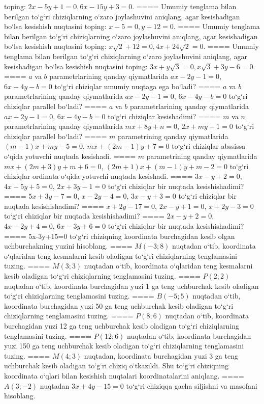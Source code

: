 toping: $2x-5y+1=0, 6x-15y+3=0$.
====
Umumiy tenglama bilan berilgan to‘g‘ri chiziqlarning
o‘zaro joylashuvini aniqlang, agar kesishadigan bo‘lsa kesishish nuqtasini
toping: $x-5=0, y+12=0$.
====
Umumiy tenglama bilan berilgan to‘g‘ri chiziqlarning
o‘zaro joylashuvini aniqlang, agar kesishadigan bo‘lsa kesishish nuqtasini
toping: $x\sqrt{2}+12=0, 4x+24\sqrt{2}=0$.
====
Umumiy tenglama bilan berilgan to‘g‘ri chiziqlarning
o‘zaro joylashuvini aniqlang, agar kesishadigan bo‘lsa kesishish nuqtasini
toping: $3x+y\sqrt{3}=0, x\sqrt{3}+3y-6=0$.
====
$a$ va $b$ parametrlarining qanday qiymatlarida
$ax-2y-1=0$, $6x-4y-b=0$ to‘g‘ri chiziqlar umumiy nuqtaga ega bo‘ladi?
====
$a$ va $b$ parametrlarining qanday qiymatlarida
$ax-2y-1=0$, $6x-4y-b=0$ to‘g‘ri chiziqlar parallel bo‘ladi?
====
$a$ va $b$ parametrlarining qanday qiymatlarida
$ax-2y-1=0$, $6x-4y-b=0$ to‘g‘ri chiziqlar kesishadimi?
====
$m$ va $n$ parametrlarining qanday qiymatlarida
$mx+8y+n=0$, $2x+my-1=0$ to‘g‘ri chiziqlar parallel bo‘ladi?
====
$m$ parametrining qanday qiymatlarida
$ (m-1) x+my-5=0$, $mx+ (2m-1) y+7=0$ to‘g‘ri chiziqlar abssissa
o‘qida yotuvchi nuqtada kesishadi.
====
$m$ parametrining qanday qiymatlarida
$mx+ (2m+3) y+m+6=0$, $ (2m+1) x+ (m-1) y+m-2=0$ to‘g‘ri chiziqlar ordinata
o‘qida yotuvchi nuqtada kesishadi.
====
$3x-y+2=0$, $4x-5y+5=0$, $2x+3y-1=0$
to‘g‘ri chiziqlar bir nuqtada kesishishadimi?
====
$5x+3y-7=0$, $x-2y-4=0$, $3x-y+3=0$
to‘g‘ri chiziqlar bir nuqtada kesishishadimi?
====
$x+2y-17=0$, $2x-y+1=0$, $x+2y-3=0$
to‘g‘ri chiziqlar bir nuqtada kesishishadimi?
====
$2x-y+2=0$, $4x-2y+4=0$, $6x-3y+6=0$
to‘g‘ri chiziqlar bir nuqtada kesishishadimi?
====
5x-3y+15=0 to‘g‘ri chiziqning koordinata burchagidan
kesib olgan uchburchakning yuzini hisoblang.
====
$M (-3;8) $ nuqtadan o‘tib, koordinata o‘qlaridan
teng kesmalarni kesib oladigan to‘g‘ri chiziqlarning tenglamasini tuzing.
====
$M (3;3)$ nuqtadan o‘tib, koordinata o‘qlaridan teng
kesmalarni kesib oladigan to‘g‘ri chiziqlarning tenglamasini tuzing.
====
$P (2;2)$ nuqtadan o‘tib, koordinata burchagidan
yuzi 1 ga teng uchburchak kesib oladigan to‘g‘ri chiziqlarning
tenglamasini tuzing.
====
$B (-5;5)$ nuqtadan o‘tib, koordinata burchagidan
yuzi 50 ga teng uchburchak kesib oladigan to‘g‘ri chiziqlarning tenglamasini
tuzing.
====
$P (8;6) $ nuqtadan o‘tib, koordinata burchagidan
yuzi 12 ga teng uchburchak kesib oladigan to‘g‘ri chiziqlarning tenglamasini
tuzing.
====
$P (12;6)$ nuqtadan o‘tib, koordinata burchagidan
yuzi 150 ga teng uchburchak kesib oladigan to‘g‘ri chiziqlarning
tenglamasini tuzing.
====
$M (4;3) $ nuqtadan, koordinata burchagidan
yuzi 3 ga teng uchburchak kesib oladigan to‘g‘ri chiziq o‘tkazildi.
Shu to‘g‘ri chiziqning koordinata o‘qlari bilan kesishish nuqtalari
koordinatalarini aniqlang.
====
$A (3;-2) $ nuqtadan $3x+4y-15=0$ to‘g‘ri chiziqqa
gacha siljishni va masofani hisoblang.